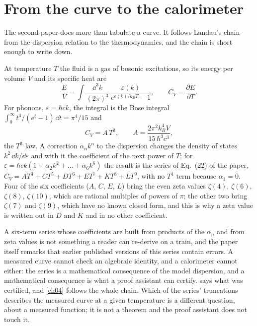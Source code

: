 \section{From the curve to the calorimeter}\label{ch01:sec-chain}

The second paper does more than tabulate a curve. It follows Landau's chain from the dispersion relation to the thermodynamics, and the chain is short enough to write down.

\begin{keybox}
At temperature $T$ the fluid is a gas of bosonic excitations, so its energy per volume $V$ and its specific heat are
\[
\frac{E}{V}=\int\!\frac{\dd^3k}{(2\pi)^3}\,\frac{\varepsilon(k)}{e^{\varepsilon(k)/k_BT}-1},\qquad C_V=\frac{\partial E}{\partial T}.
\]
For phonons, $\varepsilon=\hbar ck$, the integral is the Bose integral $\int_0^\infty t^3/(e^t-1)\,\dd t=\pi^4/15$ and
\[
C_V=A\,T^3,\qquad A=\frac{2\pi^2k_B^4V}{15\,\hbar^3c^3},
\]
the $T^3$ law. A correction $\alpha_nk^n$ to the dispersion changes the density of states $k^2\,\dd k/\dd\varepsilon$ and with it the coefficient of the next power of $T$; for $\varepsilon=\hbar ck(1+\alpha_2k^2+\dots+\alpha_6k^6)$ the result is the series of Eq.~(22) of the paper, $C_V=AT^3+CT^5+DT^6+ET^7+KT^8+LT^9$, with no $T^4$ term because $\alpha_1=0$. Four of the six coefficients ($A$, $C$, $E$, $L$) bring the even zeta values $\zeta(4)$, $\zeta(6)$, $\zeta(8)$, $\zeta(10)$, which are rational multiples of powers of $\pi$; the other two bring $\zeta(7)$ and $\zeta(9)$, which have no known closed form, and this is why a zeta value is written out in $D$ and $K$ and in no other coefficient.
\end{keybox}

A six-term series whose coefficients are built from products of the $\alpha_n$ and from zeta values is not something a reader can re-derive on a train, and the paper itself remarks that earlier published versions of this series contain errors. A measured curve cannot check an algebraic identity, and a calorimeter cannot either: the series is a mathematical consequence of the model dispersion, and a mathematical consequence is what a proof assistant can certify.  says what was certified, and \cref{ch04} follows the whole chain. Which of the series' truncations describes the measured curve at a given temperature is a different question, about a measured function; it is not a theorem and the proof assistant does not touch it.

